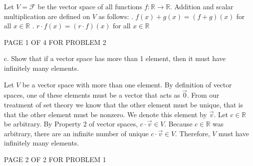 \documentclass[12pt]{article}
\newenvironment{problem}[2][Problem]
{
	\begin{trivlist} 
		\item[\hskip \labelsep {\bfseries #1 #2:}]
	}
{
	\end{trivlist}
	}
\newenvironment{solution}[1][Solution]
{
	\begin{trivlist} 
		\item[\hskip \labelsep {\itshape #1:}]
	}
	{
	\end{trivlist}
}
\begin{document}
\begin{problem}{2}
\begin{solution}
Let $V=\mathcal{F}$ be the vector space of all functions $f:\mathbb{R} \to \mathbb{R}$. Addition and scalar multiplication are defined on $V$ as follows:
\newline
\newline
{}. $f(x) + g(x) = (f+g)(x)$ for all $x \in \mathbb{R}$
\newline
\newline
{}. $r\cdot f(x)=(r\cdot f)(x)$ for all $x\in \mathbb{R}$%
%
%
%
%
%
%
%
\end{solution}
\vfill
\centerline{PAGE 1 OF 4 FOR PROBLEM 2}






\newpage
c. Show that if a vector space has more than 1 element, then it must have infinitely many elements.
\begin{solution}
Let $V$ be a vector space with more than one element. By definition of vector spaces, one of these elements must be a vector that acts as $\vec{0}$. From our treatment of set theory we know that the other element must be unique, that is that the other element must be nonzero. We denote this element by $\vec{v}$. Let $c \in \mathbb{R}$ be arbitrary. By Property 2 of vector spaces, $c\cdot \vec{v} \in V$. Because $c \in \mathbb{R}$ was arbitrary, there are an infinite number of unique $c\cdot \vec{v} \in V$. Therefore, $V$ must have infinitely many elements.
\end{solution}
\vfill
\centerline{PAGE 2 OF 2 FOR PROBLEM 1}








\end{problem}
\end{document}
